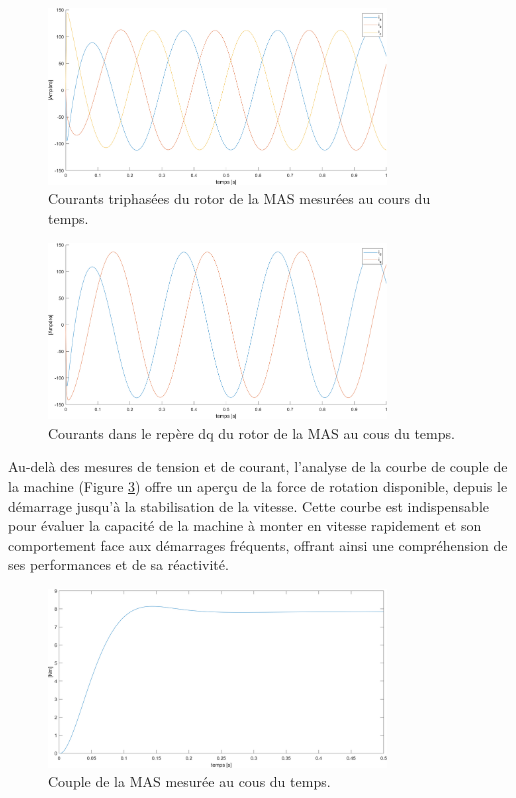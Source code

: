 \begin{figure}[!h]
    \centering
    \includegraphics[width=0.8\textwidth]{simusMATLAB/MAS/ir_abc.png} 
    \caption{Courants triphasées du rotor de la MAS mesurées au cours du temps.}
    \label{img-simuMatlab-ir_abc}
\end{figure}

\begin{figure}[!h]
    \centering
    \includegraphics[width=0.8\textwidth]{simusMATLAB/MAS/ir_dq.png} 
    \caption{Courants dans le repère dq du rotor de la MAS au cous du temps.}
    \label{img-simuMatlab-ir_dq}
\end{figure}


Au-delà des mesures de tension et de courant, l'analyse de la courbe de couple de la machine (Figure \ref{img-simuMatlab-Ce}) offre un aperçu de la force de rotation disponible, depuis le démarrage jusqu'à la stabilisation de la vitesse. Cette courbe est indispensable pour évaluer la capacité de la machine à monter en vitesse rapidement et son comportement face aux démarrages fréquents, offrant ainsi une compréhension de ses performances et de sa réactivité.


\begin{figure}[!h]
    \centering
    \includegraphics[width=0.8\textwidth]{simusMATLAB/MAS/Ce.png} 
    \caption{Couple de la MAS mesurée au cous du temps.}
    \label{img-simuMatlab-Ce}
\end{figure}

